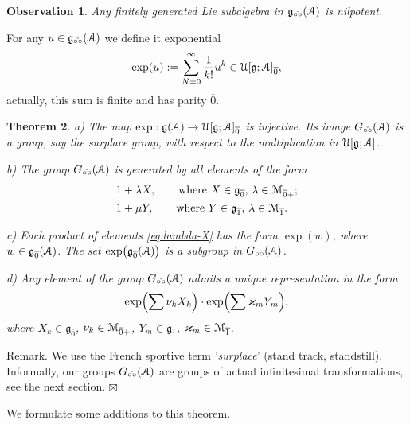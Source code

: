 \documentclass[]{amsart}
\newcounter{sec}
\newtheorem{theorem}{Theorem}[sec]
\newtheorem{observation}[theorem]{Observation}
\def\kappa{\varkappa}
\def\cA{\EuScript A}
\def\cM{\EuScript M}
\def\cU{\EuScript U}
\def\frg{\mathfrak g}
\def\ov{\overline}
\def\sm{\smallskip}
\def\0{{\ov 0}}
\def\1{{\ov 1}}
\def\vel{{\check{\circ\circ}}}
\begin{document}
\begin{observation}
Any finitely generated Lie subalgebra in $\frg_\vel(\cA)$ is
nilpotent.
\end{observation}

For any $u\in \frg_\vel(\cA)$ we define it exponential
$$
\exp(u):=\sum_{N=0}^\infty \frac 1{k!} u^k \in \cU[\frg;\cA]_\0,
$$
actually, this sum is finite and has parity $\0$.

\begin{theorem}
\label{th:1}
{\rm a)} The map $\exp: \frg(\cA)\to  \cU[\frg;\cA]_\0$ is injective.
  Its image  $G_\vel(\cA)$
  is a group, say the {\rm surplace group},  with respect to the multiplication
 in $\cU[\frg;\cA]$.  
 

 
 \sm
 
 
{\rm b)} The group $G_\vel(\cA)$ is generated by all elements of the form
\begin{align}
&1+\lambda X,\qquad \text{where $X\in \frg_\0$, $\lambda\in \cM_{\0+}$;}
\label{eq:lambda-X}
\\
&1+\mu Y,\qquad \text{where $Y\in \frg_\1$, $\lambda\in \cM_{\1}$.}
\label{eq:mu-Y}
\end{align}

 {\rm c)} Each product of elements \eqref{eq:lambda-X} has the form
 $\exp(w)$, where $w\in \frg_{\ov 0}(\cA)$.
 The set $\exp\bigl(\frg_\0(\cA)\bigr)$ is a subgroup in $G_\vel(\cA)$.
 
 \sm

{\rm d)} Any element of the group $G_\vel(\cA)$
admits a unique representation in  the form
\begin{equation}
\exp\Bigl(\sum \nu_k X_k\Bigr) \cdot \exp\Bigl(\sum \kappa_m Y_m\Bigr),
\label{eq:exp-exp}
\end{equation}
where $X_k\in \frg_\0$, $\nu_k\in \cM_{\0+}$, $Y_m\in \frg_\1$, $\kappa_m\in\cM_\1$.
\end{theorem}

{\sc Remark.} We use the French sportive term
 '{\it surplace}' (stand track, standstill). Informally, our groups $G_\vel(\cA)$ are groups of actual infinitesimal
transformations, see the next section.
\hfill $\boxtimes$

 \sm

We  formulate some additions to this theorem.
\end{document}
